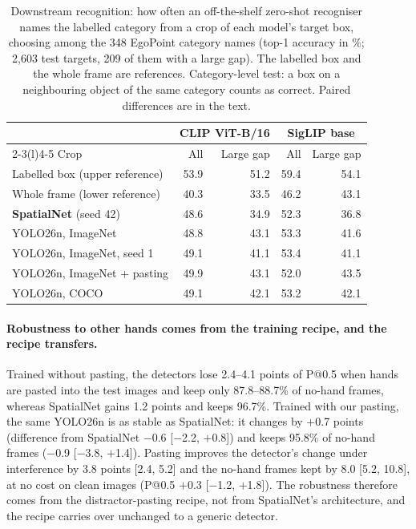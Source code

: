 \begin{table}[t]
  \caption{Downstream recognition: how often an off-the-shelf zero-shot recogniser names the labelled category from a crop of each model's target box, choosing among the 348 EgoPoint category names (top-1 accuracy in \%; 2,603 test targets, 209 of them with a large gap). The labelled box and the whole frame are references. Category-level test: a box on a neighbouring object of the same category counts as correct. Paired differences are in the text.}
  \label{tab:recog}
  \footnotesize
  \begin{tabular}{lrrrr}
    \toprule
    & \multicolumn{2}{c}{CLIP ViT-B/16} & \multicolumn{2}{c}{SigLIP base} \\
    \cmidrule(lr){2-3}\cmidrule(l){4-5}
    Crop & All & Large gap & All & Large gap \\
    \midrule
    Labelled box (upper reference) & 53.9 & 51.2 & 59.4 & 54.1 \\
    Whole frame (lower reference) & 40.3 & 33.5 & 46.2 & 43.1 \\
    \midrule
    \textbf{SpatialNet} (seed 42) & 48.6 & 34.9 & 52.3 & 36.8 \\
    YOLO26n, ImageNet & 48.8 & 43.1 & 53.3 & 41.6 \\
    YOLO26n, ImageNet, seed 1 & 49.1 & 41.1 & 53.4 & 41.1 \\
    YOLO26n, ImageNet + pasting & 49.9 & 43.1 & 52.0 & 43.5 \\
    YOLO26n, COCO & 49.1 & 42.1 & 53.2 & 42.1 \\
    \bottomrule
  \end{tabular}
\end{table}

\paragraph{Robustness to other hands comes from the training recipe, and the recipe transfers.} Trained without pasting, the detectors lose 2.4--4.1 points of P@0.5 when hands are pasted into the test images and keep only 87.8--88.7\% of no-hand frames, whereas SpatialNet gains 1.2 points and keeps 96.7\%. Trained with our pasting, the same YOLO26n is as stable as SpatialNet: it changes by $+$0.7 points (difference from SpatialNet $-$0.6 [$-$2.2, $+$0.8]) and keeps 95.8\% of no-hand frames ($-$0.9 [$-$3.8, $+$1.4]). Pasting improves the detector's change under interference by 3.8 points [2.4, 5.2] and the no-hand frames kept by 8.0 [5.2, 10.8], at no cost on clean images (P@0.5 $+$0.3 [$-$1.2, $+$1.8]). The robustness therefore comes from the distractor-pasting recipe, not from SpatialNet's architecture, and the recipe carries over unchanged to a generic detector.

